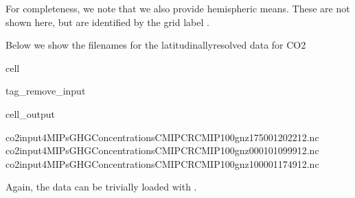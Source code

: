 \documentclass[letterpaper,10pt,english]{jupyterBook}
\begin{document}
\sphinxAtStartPar
For completeness, we note that we also provide hemispheric means.
These are not shown here,
but are identified by the grid label .

\sphinxAtStartPar
Below we show the filenames for the latitudinally\sphinxhyphen{}resolved data
for CO2

\begin{sphinxuseclass}{cell}
\begin{sphinxuseclass}{tag_remove_input}\begin{sphinxVerbatimOutput}

\begin{sphinxuseclass}{cell_output}
\begin{sphinxVerbatim}[commandchars=\\\{\}]
\PYGZhy{} co2\PYGZus{}input4MIPs\PYGZus{}GHGConcentrations\PYGZus{}CMIP\PYGZus{}CR\PYGZhy{}CMIP\PYGZhy{}1\PYGZhy{}0\PYGZhy{}0\PYGZus{}gnz\PYGZus{}175001\PYGZhy{}202212.nc
\PYGZhy{} co2\PYGZus{}input4MIPs\PYGZus{}GHGConcentrations\PYGZus{}CMIP\PYGZus{}CR\PYGZhy{}CMIP\PYGZhy{}1\PYGZhy{}0\PYGZhy{}0\PYGZus{}gnz\PYGZus{}000101\PYGZhy{}099912.nc
\PYGZhy{} co2\PYGZus{}input4MIPs\PYGZus{}GHGConcentrations\PYGZus{}CMIP\PYGZus{}CR\PYGZhy{}CMIP\PYGZhy{}1\PYGZhy{}0\PYGZhy{}0\PYGZus{}gnz\PYGZus{}100001\PYGZhy{}174912.nc
\end{sphinxVerbatim}

\end{sphinxuseclass}\end{sphinxVerbatimOutput}

\end{sphinxuseclass}
\end{sphinxuseclass}
\sphinxAtStartPar
Again, the data can be trivially loaded with .
\end{document}
